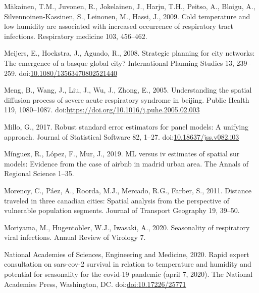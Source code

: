 \documentclass[]{elsarticle} %
\begin{document}
\leavevmode\hypertarget{ref-Makinen2009cold}{}%
Mäkainen, T.M., Juvonen, R., Jokelainen, J., Harju, T.H., Peitso, A.,
Bloigu, A., Silvennoinen-Kassinen, S., Leinonen, M., Hassi, J., 2009.
Cold temperature and low humidity are associated with increased
occurrence of respiratory tract infections. Respiratory medicine 103,
456--462.

\leavevmode\hypertarget{ref-Meijers2008strategic}{}%
Meijers, E., Hoekstra, J., Aguado, R., 2008. Strategic planning for city
networks: The emergence of a basque global city? International Planning
Studies 13, 239--259.
doi:\href{https://doi.org/10.1080/13563470802521440}{10.1080/13563470802521440}

\leavevmode\hypertarget{ref-Meng2005understanding}{}%
Meng, B., Wang, J., Liu, J., Wu, J., Zhong, E., 2005. Understanding the
spatial diffusion process of severe acute respiratory syndrome in
beijing. Public Health 119, 1080--1087.
doi:\href{https://doi.org/https://doi.org/10.1016/j.puhe.2005.02.003}{https://doi.org/10.1016/j.puhe.2005.02.003}

\leavevmode\hypertarget{ref-Millo2017robust}{}%
Millo, G., 2017. Robust standard error estimators for panel models: A
unifying approach. Journal of Statistical Software 82, 1--27.
doi:\href{https://doi.org/10.18637/jss.v082.i03}{10.18637/jss.v082.i03}

\leavevmode\hypertarget{ref-Minguez2019}{}%
Mínguez, R., López, F., Mur, J., 2019. ML versus iv estimates of spatial
sur models: Evidence from the case of airbnb in madrid urban area. The
Annals of Regional Science 1--35.

\leavevmode\hypertarget{ref-Morency2011distance}{}%
Morency, C., Páez, A., Roorda, M.J., Mercado, R.G., Farber, S., 2011.
Distance traveled in three canadian cities: Spatial analysis from the
perspective of vulnerable population segments. Journal of Transport
Geography 19, 39--50.

\leavevmode\hypertarget{ref-Moriyama2020seasonality}{}%
Moriyama, M., Hugentobler, W.J., Iwasaki, A., 2020. Seasonality of
respiratory viral infections. Annual Review of Virology 7.

\leavevmode\hypertarget{ref-National2020rapid}{}%
National Academies of Sciences, Engineering and Medicine, 2020. Rapid
expert consultation on sars-cov-2 survival in relation to temperature
and humidity and potential for seasonality for the covid-19 pandemic
(april 7, 2020). The National Academies Press, Washington, DC.
doi:\href{https://doi.org/doi:10.17226/25771}{doi:10.17226/25771}
\end{document}
